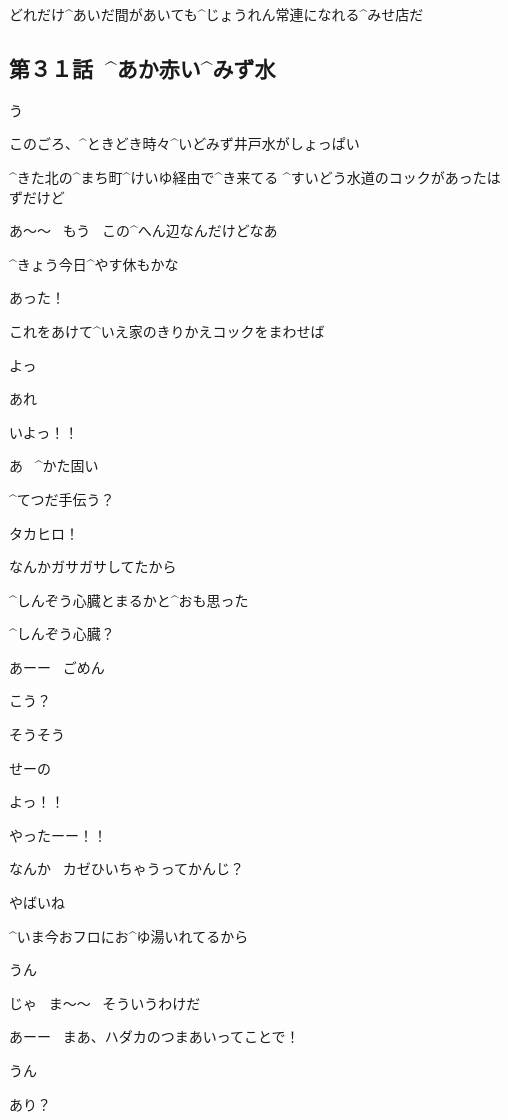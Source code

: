 \page[108]
\Narrator どれだけ^{あいだ}{間}があいても^{じょうれん}{常連}になれる^{みせ}{店}だ


\subsection{第３１話\ ^{あか}{赤}い^{みず}{水}}

\page[110]
\Alpha う

\page[111]
\Alpha このごろ、^{ときどき}{時々}^{いどみず}{井戸水}がしょっぱい

\Alpha ^{きた}{北}の^{まち}{町}^{けいゆ}{経由}で^{き}{来}てる
^{すいどう}{水道}のコックがあったはずだけど

\page[112]
\Alpha あ〜〜
\ もう
\ この^{へん}{辺}なんだけどなあ

\Alpha ^{きょう}{今日}^{やす}{休}もかな

\page[113]
\Alpha あった！

\Alpha これをあけて^{いえ}{家}のきりかえコックをまわせば

\Alpha よっ

\Alpha あれ

\Alpha いよっ！！

\Alpha あ
\ ^{かた}{固}い

\page[114]
\Takahiro ^{てつだ}{手伝}う？

\Alpha タカヒロ！

\Takahiro なんかガサガサしてたから

\Alpha ^{しんぞう}{心臓}とまるかと^{おも}{思}った

\Alpha ^{しんぞう}{心臓}？

\Takahiro あーー
\ ごめん

\page[115]
\Takahiro こう？

\Alpha そうそう

\Alpha せーの

\Alpha よっ！！

\Alpha やったーー！！

\page[117]
\Alpha なんか
\ カゼひいちゃうってかんじ？

\Takahiro やばいね

\Alpha ^{いま}{今}おフロにお^{ゆ}{湯}いれてるから

\Takahiro うん

\Alpha じゃ
\ ま〜〜
\ そういうわけだ

\page[118]
\Alpha あーー
\ まあ、ハダカのつまあいってことで！

\Takahiro うん

\Alpha あり？

